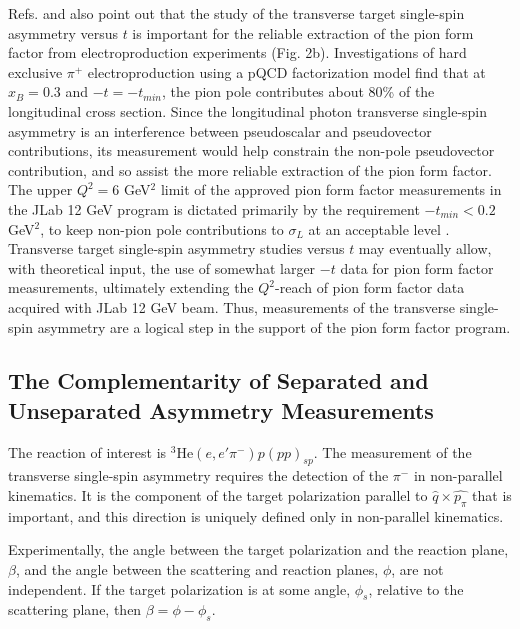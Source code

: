Refs. \cite{Go01} and \cite{Fr00} also point out that the study of the
transverse target single-spin asymmetry versus $t$ is important for the
reliable extraction of the pion form factor from electroproduction experiments
(Fig. 2b).  Investigations of hard exclusive $\pi^+$ electroproduction using a
pQCD factorization model \cite{Ma99,Ca90} find that at $x_B=0.3$ and
$-t=-t_{min}$, the pion pole contributes about 80\% of the longitudinal cross
section.  Since the longitudinal photon transverse single-spin asymmetry is an
interference between
pseudoscalar and pseudovector contributions, its measurement would help
constrain the non-pole pseudovector contribution, and so assist the more
reliable extraction of the pion form factor.  The upper $Q^2=6$ GeV$^2$ limit
of the approved pion form factor measurements in the JLab 12 GeV program
\cite{12GeV} is dictated primarily by the requirement $-t_{min}<0.2$ GeV$^2$,
to keep non-pion pole contributions to $\sigma_L$ at an acceptable level
\cite{Ca90}.  Transverse target single-spin asymmetry studies versus $t$ may
eventually allow, with theoretical input, the use of somewhat larger $-t$ data
for pion form factor measurements, ultimately extending the $Q^2$-reach of pion
form factor data acquired with JLab 12 GeV beam.  Thus, measurements of
the transverse single-spin asymmetry are a logical step in the support of the
pion form factor program.

\subsection{The Complementarity of Separated and Unseparated Asymmetry
  Measurements}

The reaction of interest is $^3$He$(e,e'\pi^-)p(pp)_{sp}$.
The measurement of the transverse single-spin asymmetry requires the detection
of the $\pi^-$ in non-parallel kinematics.  It is the component of the target
polarization parallel to $\hat{q}\times\hat{p_{\pi}}$ that is important, and
this direction is uniquely defined only in non-parallel kinematics.

Experimentally, the angle between the target polarization and the reaction
plane, $\beta$, and the angle between the scattering and reaction planes,
$\phi$, are not independent.  If the target polarization is at some angle,
$\phi_s$, relative to the scattering plane, then $\beta = \phi-\phi_s$.  

